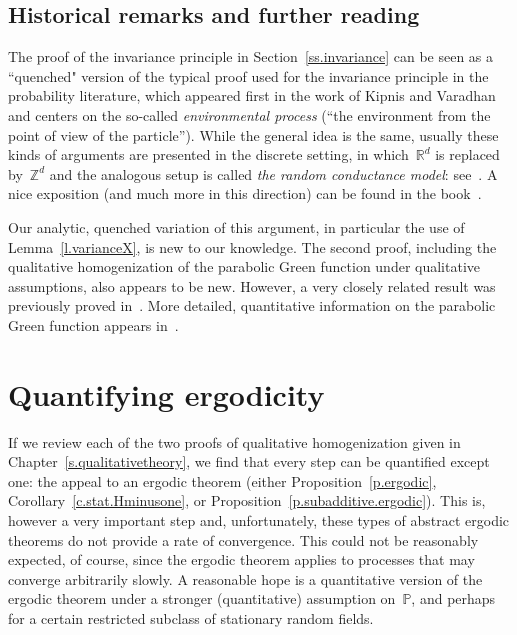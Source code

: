 \documentclass[11pt,twoside]{article} %
\numberwithin{equation}{section}
\theoremstyle{definition}
\newcommand*{\Zd}{\ensuremath{\mathbb{Z}^d}}
\newcommand*{\Rd}{\ensuremath{\mathbb{R}^d}}
\renewcommand{\P}{\mathbb{P}}
\begin{document}
\subsection*{Historical remarks and further reading}

The proof of the invariance principle in Section~\ref{ss.invariance} can be seen as a ``quenched" version of the typical proof used for the invariance principle in the probability literature, which appeared first in the work of Kipnis and Varadhan~\cite{KV} and centers on the so-called \emph{environmental process} (``the environment from the point of view of the particle''). 
While the general idea is the same, usually these kinds of arguments are presented in the discrete setting, in which~$\Rd$ is replaced by~$\Zd$ and the analogous setup is called \emph{the random conductance model}: see~\cite{Biskup,EGMN}. 
A nice exposition (and much more in this direction) can be found in the book~\cite{KLO}. 

Our analytic, quenched variation of this argument, in particular the use of Lemma~\ref{l.varianceX}, is new to our knowledge. The second proof, including the qualitative homogenization of the parabolic Green function under qualitative assumptions, also appears to be new. However, a very closely related result was previously proved in~\cite[Section 8.6]{AKMBook}. More detailed, quantitative information on the parabolic Green function appears in~\cite[Chapter 9]{AKMBook}.









\section{Quantifying ergodicity}
\label{s.CFS} 

If we review each of the two proofs of qualitative homogenization given in Chapter~\ref{s.qualitativetheory}, we find that every step can be quantified except one: the appeal to an ergodic theorem (either Proposition~\ref{p.ergodic}, Corollary~\ref{c.stat.Hminusone}, or Proposition~\ref{p.subadditive.ergodic}). 
This is, however a very important step and, 
unfortunately, these types of abstract ergodic theorems do not provide a rate of convergence. This could not be reasonably expected, of course, since the ergodic theorem applies to processes that may converge arbitrarily slowly. A reasonable hope is a quantitative version of the ergodic theorem under a stronger (quantitative) assumption on~$\P$, and perhaps for a certain restricted subclass of stationary random fields. 
\end{document}
